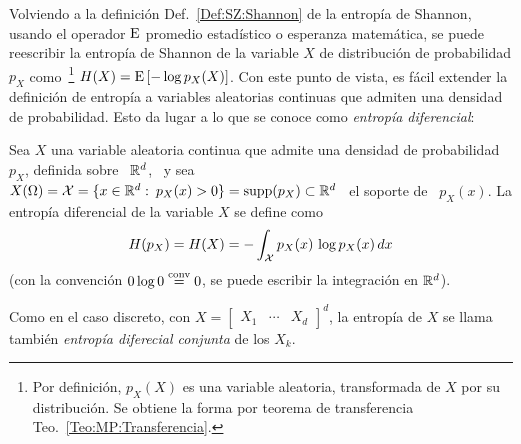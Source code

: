 
\label{Ssec:SZ:Diferencial}

Volviendo  a  la  definici\'on  Def.~\ref{Def:SZ:Shannon} de  la  entrop\'ia  de
Shannon,  usando   el  operador   $\operatorname{E}$  promedio  estad\'istico   o  esperanza
matem\'atica, se puede reescribir la entrop\'ia de Shannon de la variable $X$ de
distribuci\'on de  probabilidad $p_X$ como~\footnote{Por  definici\'on, $p_X(X)$
es una variable aleatoria, transformada de $X$ por su distribuci\'on. Se obtiene
la forma  por teorema de transferencia  Teo.~\ref{Teo:MP:Transferencia}.}  $H(X)
=  \operatorname{E}\left[ -  \log p_X(X)  \right]$.   Con este  punto de  vista, es  f\'acil
extender  la definici\'on  de entrop\'ia  a variables  aleatorias continuas  que
admiten una  densidad de probabilidad.   Esto da lugar a  lo que se  conoce como
{\it entrop\'ia diferencial}:

\begin{definicion}
\label{Def:SZ:EntropiaDiferencial}
%
  Sea  $X$  una   variable  aleatoria  continua  que  admite   una  densidad  de
  probabilidad \ $p_X$,  definida sobre \ $\mathbb{R}^d$,  \ y sea \  $X(\Omega) = \mathcal{X}
  = \{  x \in  \mathbb{R}^d: \:  p_X(x) >  0 \}  = \operatorname{supp}(p_X)  \subset \mathbb{R}^d$  \ el
  soporte  de \  $p_X(x)$.  La  entrop\'ia diferencial  de  la  variable $X$  se
  define como
  \[
  H(p_X) = H(X) = - \int_{\mathcal{X}} p_X(x) \, \log p_X(x) \, dx
  \]
  (con la  convenci\'on $0 \log  0 \stackrel{\mathrm{conv}}{=} 0$,  se puede escribir la  integraci\'on en
  $\mathbb{R}^d$).
\end{definicion}
%
Como  en   el  caso  discreto,  con   $X  =  \begin{bmatrix}  X_1   &  \cdots  &
X_d \end{bmatrix}^d$,  la entrop\'ia de  $X$ se llama tambi\'en  {\it entrop\'ia
diferecial conjunta} de los $X_k$.

